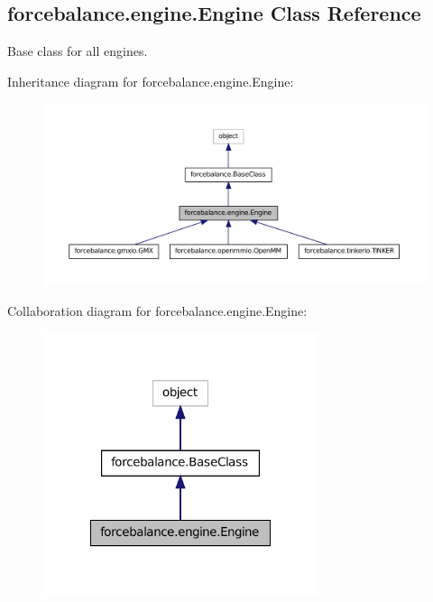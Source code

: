 \hypertarget{classforcebalance_1_1engine_1_1Engine}{\subsection{forcebalance.\-engine.\-Engine Class Reference}
\label{classforcebalance_1_1engine_1_1Engine}
}


Base class for all engines.  




Inheritance diagram for forcebalance.\-engine.\-Engine\-:
\nopagebreak
\begin{figure}[H]
\begin{center}
\leavevmode
\includegraphics[width=350pt]{classforcebalance_1_1engine_1_1Engine__inherit__graph}
\end{center}
\end{figure}


Collaboration diagram for forcebalance.\-engine.\-Engine\-:
\nopagebreak
\begin{figure}[H]
\begin{center}
\leavevmode
\includegraphics[width=228pt]{classforcebalance_1_1engine_1_1Engine__coll__graph}
\end{center}
\end{figure}
